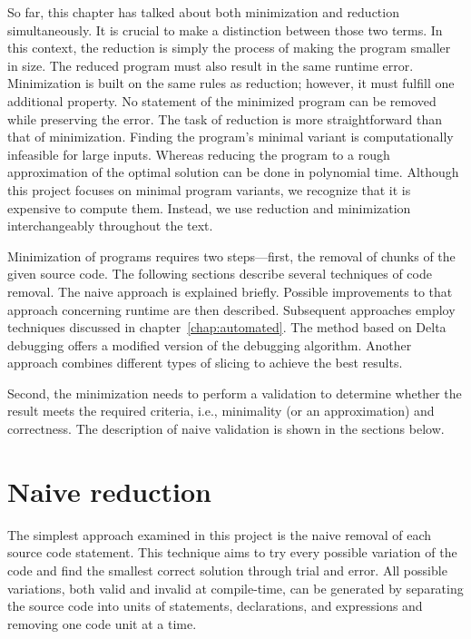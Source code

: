 
So far, this chapter has talked about both minimization and reduction 
simultaneously. 
It is crucial to make a distinction between those two terms. 
In this context, the reduction is simply the process of making the program 
smaller in size. 
The reduced program must also result in the same runtime error. 
Minimization is built on the same rules as reduction; however, it must 
fulfill one additional property. 
No statement of the minimized program can be removed while preserving 
the error. 
The task of reduction is more straightforward than that of minimization. 
Finding the program's minimal variant is computationally infeasible for 
large inputs. 
Whereas reducing the program to a rough approximation of the optimal 
solution can be done in polynomial time. 
Although this project focuses on minimal program variants, we recognize that 
it is expensive to compute them. 
Instead, we use reduction and minimization interchangeably throughout 
the text.

Minimization of programs requires two steps—first, the removal of chunks 
of the given source code. 
The following sections describe several techniques of code removal. 
The naive approach is explained briefly. 
Possible improvements to that approach concerning runtime are then described. 
Subsequent approaches employ techniques discussed in 
chapter~\ref{chap:automated}. 
The method based on Delta debugging offers a modified version of 
the debugging algorithm. 
Another approach combines different types of slicing to achieve the best 
results.

Second, the minimization needs to perform a validation to determine whether 
the result meets the required criteria, i.e., minimality (or an approximation) 
and correctness.
The description of naive validation is shown in the sections below.

\section{Naive reduction}\label{chap:naive}

The simplest approach examined in this project is the naive removal of each 
source code statement.
This technique aims to try every possible variation of the code and find 
the smallest correct solution through trial and error.
All possible variations, both valid and invalid at compile-time, can be 
generated by separating the source code into units of statements, 
declarations, and expressions and removing one code unit at a time.

